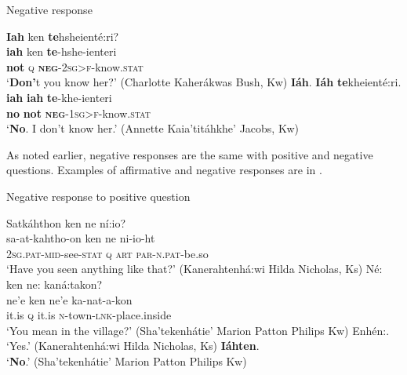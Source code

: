 \documentclass[output=paper,colorlinks,citecolor=brown]{langscibook}
\begin{document}
\ea\label{ex:moh:64}Negative response\\
    \begin{xlist}[CKB:]
        \glll \textbf{Iah} ken \textbf{te}hsheienté:ri? \\
             \textbf{iah} ken \textbf{te}-hshe-ienteri \\
             \textbf{not} \textsc{q} \textbf{\textsc{neg}}\textsc{-2sg>f-}know.\textsc{stat}\\
        \glt ‘\textbf{Don’}t you know her?’ (Charlotte Kaherákwas Bush, Kw)
    \medskip
        \glll \textbf{Iáh}. \textbf{Iáh} \textbf{te}kheienté:ri.\\
            \textbf{iah} \textbf{iah} \textbf{te}-khe-ienteri\\
            \textbf{no} \textbf{not} \textbf{\textsc{neg}}\textsc{-1sg>f}-know.\textsc{stat}\\
        \glt ‘\textbf{No}. I don’t know her.’ (Annette Kaia’titáhkhe’ Jacobs, Kw)
    \end{xlist}
\z 

As noted earlier, negative responses are the same with positive and negative questions. Examples of affirmative and negative responses are in .

\ea\label{ex:moh:65}Negative response to positive question\\ 
\begin{xlist}[SMP:]
    \label{ex:moh:65a}
        \glll Satkáhthon ken ne ní:io? \\
             sa-at-kahtho-on ken ne ni-io-ht \\
             \textsc{2sg.pat-mid}-see-\textsc{stat} \textsc{q} \textsc{art} \textsc{par-n.pat}-be.so\\
        \glt ‘Have you seen anything like that?’ (Kanerahtenhá:wi Hilda Nicholas, Ks)
    \label{ex:moh:65b}\medskip
        \glll Né: ken ne: kaná:takon? \\
            ne’e ken ne’e ka-nat-a-kon \\
            it.is \textsc{q} it.is \textsc{n-}town-\textsc{lnk-}place.inside \\
        \glt ‘You mean in the village?’ (Sha’tekenhátie’ Marion Patton Philips Kw)
    \label{ex:moh:65c}\medskip
        \gl Enhén:.\\
        \glt ‘Yes.’  (Kanerahtenhá:wi Hilda Nicholas, Ks)
    \label{ex:moh:65d} \medskip
        \gl \textbf{Iáhten}.\\
        \glt ‘\textbf{No}.’ (Sha’tekenhátie’ Marion Patton Philips Kw)
\end{xlist}
\z
\end{document}
